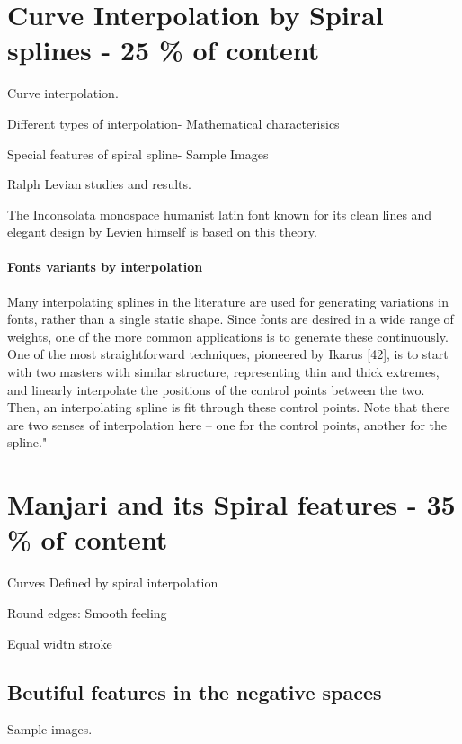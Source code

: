 \documentclass[10pt]{article}
\begin{document}
\section{Curve Interpolation by Spiral splines - 25 \% of content}

Curve interpolation.

Different types of interpolation- Mathematical characterisics

Special features of spiral spline- Sample Images

Ralph Levian studies and results. 

The Inconsolata monospace humanist latin font known for its clean lines and elegant design by Levien himself is based on this theory.

\paragraph{Fonts variants by interpolation}
Many interpolating splines in the literature are used for generating variations in fonts, rather
than a single static shape. Since fonts are desired in a wide range of weights, one of the more
common applications is to generate these continuously. One of the most straightforward techniques,
pioneered by Ikarus [42], is to start with two masters with similar structure, representing thin
and thick extremes, and linearly interpolate the positions of the control points between the two.
Then, an interpolating spline is fit through these control points. Note that there are two senses of
interpolation here – one for the control points, another for the spline." \cite{lamport94}


\section{Manjari and its Spiral features - 35 \% of content}

Curves Defined by spiral interpolation

Round edges: Smooth feeling

Equal widtn stroke

\subsection{Beutiful features in the negative spaces}

Sample images.
\end{document}
